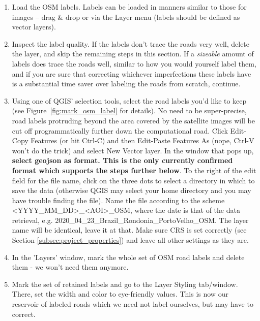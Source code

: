 \documentclass[12pt,a4paper]{scrartcl}
\begin{document}
\begin{enumerate}
	\item Load the OSM labels. Labels can be loaded in manners similar to those for images -- drag \& drop or via the Layer menu (labels should be defined as vector layers).
	\item Inspect the label quality. If the labels don't trace the roads very well, delete the layer, and skip the remaining steps in this section. If a \textit{sizeable} amount of labels does trace the roads well, similar to how you would yourself label them, and if you are sure that correcting whichever imperfections these labels have is a substantial time saver over labeling the roads from scratch, continue.
	\item Using one of QGIS' selection tools, select the road labels you'd like to keep (see Figure~\ref{fig:mark_osm_label} for details). No need to be super-precise, road labels protruding beyond the area covered by the satellite images  will be cut off programmatically further down the computational road.	Click Edit-Copy Features (or hit Ctrl-C) and then Edit-Paste Features As (nope, Ctrl-V won't do the trick) and select New Vector layer. In the window that pops up, \textbf{select geojson as format. This is the only currently confirmed format which supports the steps further below}. To the right of the edit field for the file name, click on the three dots to select a directory in which to save the data (otherwise QGIS may select your home directory and you may have trouble finding the file). Name the file according to the scheme <YYYY\_MM\_DD>\_<AOI>\_OSM, where the date is that of the data retrieval, e.g. 2020\_04\_23\_Brazil\_Rondonia\_PortoVelho\_OSM. The layer name will be identical, leave it at that. Make sure CRS is set correctly (see Section \ref{subsec:project_properties}) and leave all other settings as they are.
	\item In the 'Layers' window, mark the whole set of OSM road labels and delete them - we won't need them anymore.
	\item Mark the set of retained labels and go to the Layer Styling tab/window. There, set the width and color to eye-friendly values. This is now our reservoir of labeled roads which we need not label ourselves, but may have to correct.
\end{enumerate}
\end{document}
